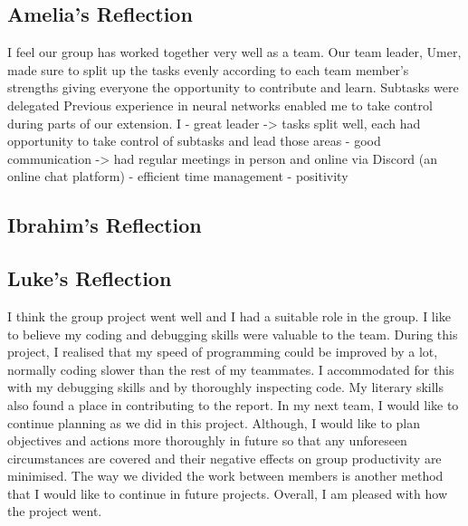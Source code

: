 \documentclass[11pt]{article}
\begin{document}
\subsection{Amelia's Reflection}
I feel our group has worked together very well as a team. Our team leader, Umer, made sure to split up the tasks evenly according to each team member's strengths giving everyone the opportunity to contribute and learn. Subtasks were delegated 
Previous experience in neural networks enabled me to take control during parts of our extension. I 
- great leader -> tasks split well, each had opportunity to take control of subtasks and lead those areas
- good communication -> had regular meetings in person and online via Discord (an online chat platform)
- efficient time management
- positivity

\subsection{Ibrahim's Reflection}

\subsection{Luke's Reflection}
I think the group project went well and I had a suitable role in the group.
I like to believe my coding and debugging skills were valuable to the team.
During this project, I realised that my speed of programming could be improved by a lot,
normally coding slower than the rest of my teammates. I accommodated for this
with my debugging skills and by thoroughly inspecting code.
My literary skills also found a place in contributing to the report.
In my next team, I would like to continue planning as we did in this project.
Although, I would like to plan objectives and actions more thoroughly in future so that
any unforeseen circumstances are covered and their negative effects on group 
productivity are minimised. The way we divided the work between members is another
method that I would like to continue in future projects.
Overall, I am pleased with how the project went.
\end{document}
